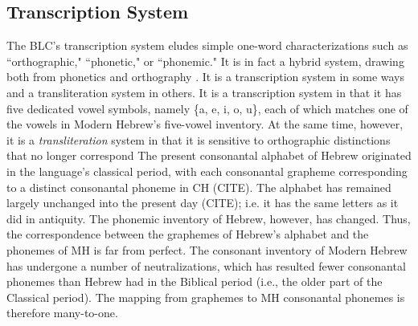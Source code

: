 \subsection{Transcription System}\label{sec:transcription}
The \ac{BLC}'s transcription system eludes simple one-word characterizations 
such as ``orthographic,"
``phonetic," or ``phonemic." It is in fact a hybrid system, drawing
both from phonetics and orthography \citep{albert-et-al:2013}. 
It is a transcription system in some ways and a transliteration system in others.
It is a transcription system in that it has five dedicated vowel symbols, 
namely \{a, e, i, o, u\}, each of which matches one of the vowels in Modern 
Hebrew's five-vowel inventory. %
At the same time, however, 
it is a \emph{transliteration} system in that it is sensitive to 
orthographic distinctions that no longer correspond
The present consonantal alphabet of Hebrew originated in the 
language's classical period, with each 
consonantal grapheme corresponding to 
a distinct consonantal phoneme in \ac{CH} (CITE). The alphabet 
has remained largely unchanged 
into the present day (CITE); i.e. it has the same letters as it 
did in antiquity. The phonemic inventory 
of Hebrew, however, has changed. Thus, the correspondence 
between the graphemes of Hebrew's 
alphabet and the phonemes of \ac{MH} is far from perfect. 
The consonant inventory of Modern 
Hebrew has undergone a number of neutralizations, which 
has resulted fewer consonantal phonemes 
than Hebrew had in the Biblical period (i.e., the older part 
of the Classical period). The mapping 
from graphemes 
to \ac{MH} consonantal phonemes is therefore many-to-one.


